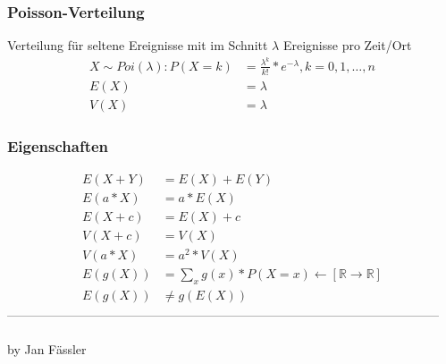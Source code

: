 \documentclass[landscape,twocolumn,a4paper]{article}
\newcommand{\RN}{\mathbb{R}} %
\begin{document}
\subsubsection*{Poisson-Verteilung}
Verteilung für seltene Ereignisse mit im Schnitt $\lambda$ Ereignisse pro Zeit/Ort
\begin{align}
	X \sim Poi(\lambda): P(X = k) &=\frac{\lambda^k}{k!}*e^{-\lambda}, k=0,1, \dots, n \\
	E(X) &= \lambda\\
	V(X) &= \lambda
\end{align} 

\subsubsection*{Eigenschaften}

\begin{align}
	E(X + Y) &= E(X) + E(Y) \\
	E(a * X) &= a * E(X) \\
	E(X + c) &= E(X) + c\\
	V(X + c) &= V(X) \\
	V(a * X) &= a^2* V(X) \\
	E(g(X)) &= \sum_{x} g(x) * P(X=x) \leftarrow [\RN \rightarrow \RN] \\
	E(g(X)) &\neq g(E(X))
\end{align} 
--------------------------------------------------------------------------------------------------------
\\
\\
by Jan Fässler
\end{document}
